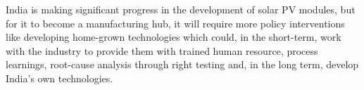 \documentclass[11pt]{article}
\begin{document}
\begin{center}
India is making significant progress in the development of solar PV modules, but for it to become a manufacturing hub, it will require more policy interventions like developing home-grown technologies which could, in the short-term, work with the industry to provide them with trained human resource, process learnings, root-cause analysis through right testing and, in the long term, develop India’s own technologies.
\end{center}
\end{document}
